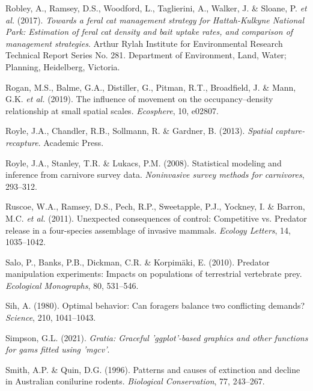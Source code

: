 \documentclass[11pt,a4paper,titlepage,twoside,openright]{style/unimelbthesis}
\begin{document}
\begin{mainmatter}
\leavevmode\hypertarget{ref-robley2017towards}{}%
Robley, A., Ramsey, D.S., Woodford, L., Taglierini, A., Walker, J. \& Sloane, P. \emph{et al.} (2017). \emph{Towards a feral cat management strategy for Hattah-Kulkyne National Park: Estimation of feral cat density and bait uptake rates, and comparison of management strategies}. Arthur Rylah Institute for Environmental Research Technical Report Series No. 281. Department of Environment, Land, Water; Planning, Heidelberg, Victoria.

\leavevmode\hypertarget{ref-rogan2019influence}{}%
Rogan, M.S., Balme, G.A., Distiller, G., Pitman, R.T., Broadfield, J. \& Mann, G.K. \emph{et al.} (2019). The influence of movement on the occupancy--density relationship at small spatial scales. \emph{Ecosphere}, 10, e02807.

\leavevmode\hypertarget{ref-royle2013spatial}{}%
Royle, J.A., Chandler, R.B., Sollmann, R. \& Gardner, B. (2013). \emph{Spatial capture-recapture}. Academic Press.

\leavevmode\hypertarget{ref-royle2008statistical}{}%
Royle, J.A., Stanley, T.R. \& Lukacs, P.M. (2008). Statistical modeling and inference from carnivore survey data. \emph{Noninvasive survey methods for carnivores}, 293--312.

\leavevmode\hypertarget{ref-ruscoe2011unexpected}{}%
Ruscoe, W.A., Ramsey, D.S., Pech, R.P., Sweetapple, P.J., Yockney, I. \& Barron, M.C. \emph{et al.} (2011). Unexpected consequences of control: Competitive vs. Predator release in a four-species assemblage of invasive mammals. \emph{Ecology Letters}, 14, 1035--1042.

\leavevmode\hypertarget{ref-salo2010predator}{}%
Salo, P., Banks, P.B., Dickman, C.R. \& Korpimäki, E. (2010). Predator manipulation experiments: Impacts on populations of terrestrial vertebrate prey. \emph{Ecological Monographs}, 80, 531--546.

\leavevmode\hypertarget{ref-sih1980optimal}{}%
Sih, A. (1980). Optimal behavior: Can foragers balance two conflicting demands? \emph{Science}, 210, 1041--1043.

\leavevmode\hypertarget{ref-gratia}{}%
Simpson, G.L. (2021). \emph{Gratia: Graceful 'ggplot'-based graphics and other functions for gams fitted using 'mgcv'}.

\leavevmode\hypertarget{ref-smith1996patterns}{}%
Smith, A.P. \& Quin, D.G. (1996). Patterns and causes of extinction and decline in Australian conilurine rodents. \emph{Biological Conservation}, 77, 243--267.


\end{mainmatter}
\end{document}
